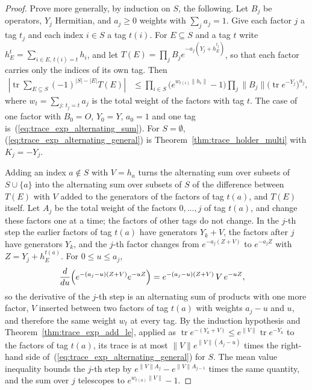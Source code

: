 \begin{proof}\leanok
    Prove more generally, by induction on $S$, the following. Let $B_j$ be
    operators, $Y_j$ Hermitian, and $a_j\ge0$ weights with $\sum_ja_j=1$.
    Give each factor $j$ a tag $t_j$ and each index $i\in S$ a tag $t(i)$.
    For $E\subseteq S$ and a tag $t$ write
    $h_E^{t}=\sum_{i\in E,\,t(i)=t}h_i$, and let
    $T(E)=\prod_jB_je^{-a_j(Y_j+h_E^{t_j})}$, so that each factor carries
    only the indices of its own tag. Then
    \begin{align}
        \left|\operatorname{tr}\sum_{E\subseteq S}(-1)^{|S|-|E|}T(E)\right|
         & \le \prod_{i\in S}\bigl(e^{w_{t(i)}\|h_i\|}-1\bigr)
        \prod_j\|B_j\|\bigl(\operatorname{tr}e^{-Y_j}\bigr)^{a_j},
        \label{eq:trace_exp_alternating_general}
    \end{align}
    where $w_t=\sum_{j:\,t_j=t}a_j$ is the total weight of the factors with
    tag $t$. The case of one factor with $B_0=O$, $Y_0=Y$, $a_0=1$ and one
    tag is~(\ref{eq:trace_exp_alternating_sum}). For $S=\emptyset$,
    (\ref{eq:trace_exp_alternating_general}) is
    Theorem~\ref{thm:trace_holder_multi} with $K_j=-Y_j$.

    Adding an index $a\notin S$ with $V=h_a$ turns the alternating sum over
    subsets of $S\cup\{a\}$ into the alternating sum over subsets of $S$ of
    the difference between $T(E)$ with $V$ added to the generators of the
    factors of tag $t(a)$, and $T(E)$ itself. Let $A_j$ be the total weight
    of the factors $0,\dots,j$ of tag $t(a)$, and change these factors one at
    a time; the factors of other tags do not change. In the
    $j$-th step the earlier factors of tag $t(a)$ have generators $Y_k+V$,
    the factors after $j$ have generators $Y_k$, and the $j$-th factor
    changes from $e^{-a_j(Z+V)}$ to $e^{-a_jZ}$ with $Z=Y_j+h_E^{t(a)}$. For
    $0\le u\le a_j$,
    \begin{align}
        \frac{d}{du}\Bigl(e^{-(a_j-u)(Z+V)}e^{-uZ}\Bigr)
         & =e^{-(a_j-u)(Z+V)}\,V\,e^{-uZ},
        \label{eq:trace_exp_alternating_duhamel}
    \end{align}
    so the derivative of the $j$-th step is an alternating sum of products
    with one more factor, $V$ inserted between two factors of tag $t(a)$ with
    weights $a_j-u$ and $u$, and therefore the same weight $w_t$ at every
    tag. By the induction
    hypothesis and
    Theorem~\ref{thm:trace_exp_add_le}, applied as
    $\operatorname{tr}e^{-(Y_k+V)}\le e^{\|V\|}\operatorname{tr}e^{-Y_k}$
    to the factors of tag $t(a)$, its trace is at most
    $\|V\|e^{\|V\|(A_j-u)}$ times the right-hand side
    of~(\ref{eq:trace_exp_alternating_general}) for $S$. The mean value
    inequality bounds the $j$-th step by
    $e^{\|V\|A_j}-e^{\|V\|A_{j-1}}$ times the same quantity, and the sum over
    $j$ telescopes to $e^{w_{t(a)}\|V\|}-1$.
\end{proof}

